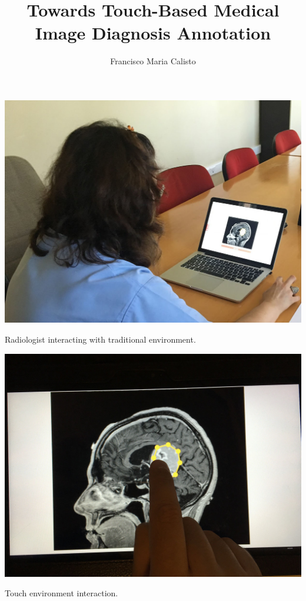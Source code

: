 \documentclass[sigchi-a, authorversion]{acmart}
\begin{document}
\begin{marginfigure}
\includegraphics[width=\marginparwidth]{header_1.jpg}
\caption{Radiologist interacting with traditional environment.}
\label{fig:Fig1}
\end{marginfigure}

\begin{marginfigure}
\includegraphics[width=\marginparwidth]{header_2.jpg}
\caption{Touch environment interaction.}
\label{fig:Fig2}
\end{marginfigure}

\title{Towards Touch-Based Medical Image Diagnosis Annotation}

\author{Francisco Maria Calisto}
\end{document}
